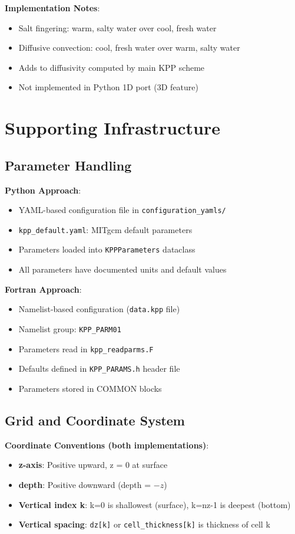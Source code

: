 \documentclass[11pt]{article}
\begin{document}
\textbf{Implementation Notes}:
\begin{itemize}
    \item Salt fingering: warm, salty water over cool, fresh water
    \item Diffusive convection: cool, fresh water over warm, salty water
    \item Adds to diffusivity computed by main KPP scheme
    \item Not implemented in Python 1D port (3D feature)
\end{itemize}

\section{Supporting Infrastructure}
\label{sec:infrastructure}

\subsection{Parameter Handling}

\textbf{Python Approach}:
\begin{itemize}
    \item YAML-based configuration file in \verb|configuration_yamls/|
    \item \verb|kpp_default.yaml|: MITgcm default parameters
    \item Parameters loaded into \verb|KPPParameters| dataclass
    \item All parameters have documented units and default values
\end{itemize}

\textbf{Fortran Approach}:
\begin{itemize}
    \item Namelist-based configuration (\verb|data.kpp| file)
    \item Namelist group: \verb|KPP_PARM01|
    \item Parameters read in \verb|kpp_readparms.F|
    \item Defaults defined in \verb|KPP_PARAMS.h| header file
    \item Parameters stored in COMMON blocks
\end{itemize}

\subsection{Grid and Coordinate System}

\textbf{Coordinate Conventions (both implementations)}:
\begin{itemize}
    \item \textbf{z-axis}: Positive upward, z = 0 at surface
    \item \textbf{depth}: Positive downward (depth = $-z$)
    \item \textbf{Vertical index k}: k=0 is shallowest (surface), k=nz-1 is deepest (bottom)
    \item \textbf{Vertical spacing}: \verb|dz[k]| or \verb|cell_thickness[k]| is thickness of cell k
\end{itemize}
\end{document}
